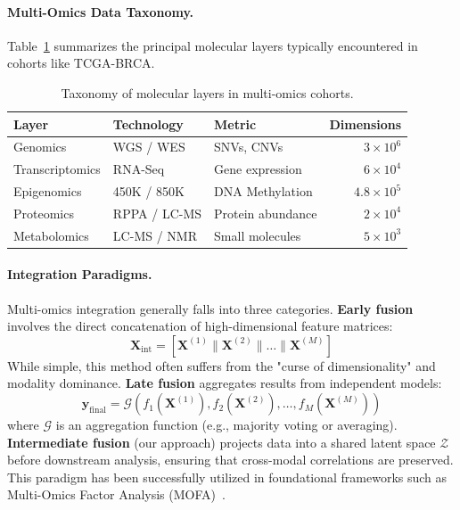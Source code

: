 \documentclass[12pt,a4paper,onecolumn]{article}
\begin{document}
\paragraph{Multi-Omics Data Taxonomy.}
Table~\ref{tab:taxonomy} summarizes the principal molecular layers typically encountered in cohorts like TCGA-BRCA.

\begin{table}[H]
\caption{Taxonomy of molecular layers in multi-omics cohorts.}\label{tab:taxonomy}
\centering
\small
\begin{tabular}{l l l r}
\toprule
\textbf{Layer} & \textbf{Technology} & \textbf{Metric} & \textbf{Dimensions} \\
\midrule
Genomics        & WGS / WES     & SNVs, CNVs        & $3 \times 10^6$ \\
Transcriptomics & RNA-Seq       & Gene expression   & $6 \times 10^4$ \\
Epigenomics     & 450K / 850K   & DNA Methylation   & $4.8 \times 10^5$ \\
Proteomics      & RPPA / LC-MS  & Protein abundance & $2 \times 10^4$ \\
Metabolomics    & LC-MS / NMR   & Small molecules   & $5 \times 10^3$ \\
\bottomrule
\end{tabular}
\end{table}

\paragraph{Integration Paradigms.}
Multi-omics integration generally falls into three categories.
\textbf{Early fusion} involves the direct concatenation of high-dimensional feature matrices:
\begin{equation}
\mathbf{X}_{\text{int}} = \left[ \mathbf{X}^{(1)} \parallel \mathbf{X}^{(2)} \parallel \dots \parallel \mathbf{X}^{(M)} \right]
\end{equation}
While simple, this method often suffers from the "curse of dimensionality" and modality dominance.
\textbf{Late fusion} aggregates results from independent models:
\begin{equation}
\mathbf{y}_{\text{final}} = \mathcal{G}(f_1(\mathbf{X}^{(1)}), f_2(\mathbf{X}^{(2)}), \dots, f_M(\mathbf{X}^{(M)}))
\end{equation}
where $\mathcal{G}$ is an aggregation function (e.g., majority voting or averaging).
\textbf{Intermediate fusion} (our approach) projects data into a shared latent space $\mathcal{Z}$ before downstream analysis, ensuring that cross-modal correlations are preserved. This paradigm has been successfully utilized in foundational frameworks such as Multi-Omics Factor Analysis (MOFA)~\cite{argelaguet2018}.
\end{document}
